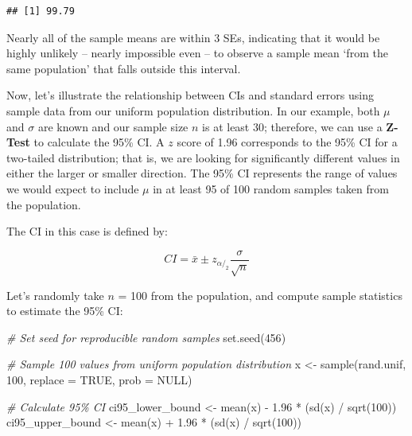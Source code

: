 \documentclass[
]{book}
\newenvironment{Shaded}{\begin{snugshade}}{\end{snugshade}}
\newcommand{\AttributeTok}[1]{\textcolor[rgb]{0.77,0.63,0.00}{#1}}
\newcommand{\CommentTok}[1]{\textcolor[rgb]{0.56,0.35,0.01}{\textit{#1}}}
\newcommand{\ConstantTok}[1]{\textcolor[rgb]{0.00,0.00,0.00}{#1}}
\newcommand{\DecValTok}[1]{\textcolor[rgb]{0.00,0.00,0.81}{#1}}
\newcommand{\FloatTok}[1]{\textcolor[rgb]{0.00,0.00,0.81}{#1}}
\newcommand{\FunctionTok}[1]{\textcolor[rgb]{0.00,0.00,0.00}{#1}}
\newcommand{\NormalTok}[1]{#1}
\newcommand{\OtherTok}[1]{\textcolor[rgb]{0.56,0.35,0.01}{#1}}
\newcommand{\SpecialCharTok}[1]{\textcolor[rgb]{0.00,0.00,0.00}{#1}}
\begin{document}
\begin{verbatim}
## [1] 99.79
\end{verbatim}

Nearly all of the sample means are within 3 SEs, indicating that it would be highly unlikely -- nearly impossible even -- to observe a sample mean `from the same population' that falls outside this interval.

Now, let's illustrate the relationship between CIs and standard errors using sample data from our uniform population distribution. In our example, both \(\mu\) and \(\sigma\) are known and our sample size \(n\) is at least 30; therefore, we can use a \textbf{Z-Test} to calculate the 95\% CI. A \(z\) score of 1.96 corresponds to the 95\% CI for a two-tailed distribution; that is, we are looking for significantly different values in either the larger or smaller direction. The 95\% CI represents the range of values we would expect to include \(\mu\) in at least 95 of 100 random samples taken from the population.

The CI in this case is defined by:

\[ CI = \bar{x} \pm z_{\alpha/_2} \frac{\sigma}{\sqrt{n}} \]

Let's randomly take \(n\) = 100 from the population, and compute sample statistics to estimate the 95\% CI:

\begin{Shaded}
\begin{Highlighting}[]
\CommentTok{\# Set seed for reproducible random samples}
\FunctionTok{set.seed}\NormalTok{(}\DecValTok{456}\NormalTok{)}

\CommentTok{\# Sample 100 values from uniform population distribution}
\NormalTok{x }\OtherTok{\textless{}{-}} \FunctionTok{sample}\NormalTok{(rand.unif, }\DecValTok{100}\NormalTok{, }\AttributeTok{replace =} \ConstantTok{TRUE}\NormalTok{, }\AttributeTok{prob =} \ConstantTok{NULL}\NormalTok{)}

\CommentTok{\# Calculate 95\% CI}
\NormalTok{ci95\_lower\_bound }\OtherTok{\textless{}{-}} \FunctionTok{mean}\NormalTok{(x) }\SpecialCharTok{{-}} \FloatTok{1.96} \SpecialCharTok{*}\NormalTok{ (}\FunctionTok{sd}\NormalTok{(x) }\SpecialCharTok{/} \FunctionTok{sqrt}\NormalTok{(}\DecValTok{100}\NormalTok{))}
\NormalTok{ci95\_upper\_bound }\OtherTok{\textless{}{-}} \FunctionTok{mean}\NormalTok{(x) }\SpecialCharTok{+} \FloatTok{1.96} \SpecialCharTok{*}\NormalTok{ (}\FunctionTok{sd}\NormalTok{(x) }\SpecialCharTok{/} \FunctionTok{sqrt}\NormalTok{(}\DecValTok{100}\NormalTok{))}
\end{Highlighting}
\end{Shaded}
\end{document}
